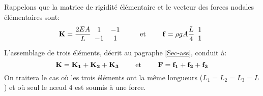 Rappelons que la matrice de rigidité élémentaire et le vecteur des forces nodales élémentaires sont:
\begin{equation} \MM{K} = \frac{2EA}L \MM{\begin{array}{cc} 1 & -1\\ -1& 1 \end{array}} %
\qquad \text{ et } \qquad
\VV{f} = \rho g A \frac{L}4 \VV{\begin{array}{c} 1 \\1 \end{array}} \end{equation}
\medskipvm
L'assemblage de trois éléments, décrit au pagraphe \ref{Sec-ass}, conduit à:
\begin{equation} \mathbf{K}=\mathbf{K_1}+\mathbf{K_2}+\mathbf{K_3} \qquad \text{ et } \qquad \mathbf{F}=\mathbf{f_1}+\mathbf{f_2}+\mathbf{f_3} \end{equation}
\medskipvm
On traitera le cas où les trois éléments ont la même longueurs ($L_1=L_2=L_3=L$) et où seul le nœud 4 est
soumis à une force.
